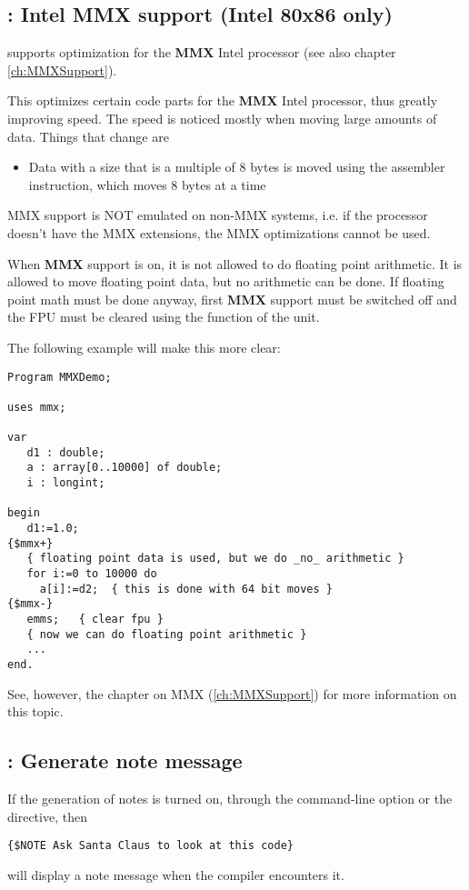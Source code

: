 \subsection{ : Intel MMX support (Intel 80x86 only)}

\fpc supports optimization for the \textbf{MMX} Intel
processor (see also chapter \ref{ch:MMXSupport}).

This optimizes certain code parts for the \textbf{MMX} Intel
processor, thus greatly improving speed. The speed is noticed mostly when
moving large amounts of data. Things that change are
\begin{itemize}
\item Data with a size that is a multiple of 8 bytes is moved using the
 assembler instruction, which moves 8 bytes at a time
\end{itemize}
\begin{remark}MMX support is NOT emulated on non-MMX systems, i.e. if
the processor doesn't have the MMX extensions, the MMX optimizations cannot
be used.
\end{remark}
When \textbf{MMX} support is on, it is not allowed to do floating point
arithmetic. It is allowed to move floating point data, but no arithmetic
can be done. If floating point math must be done anyway, first \textbf{MMX}
 support must be switched off and the FPU must be cleared using the 
function of the  unit.

The following example will make this more clear:
\begin{verbatim}
Program MMXDemo;

uses mmx;

var
   d1 : double;
   a : array[0..10000] of double;
   i : longint;

begin
   d1:=1.0;
{$mmx+}
   { floating point data is used, but we do _no_ arithmetic }
   for i:=0 to 10000 do
     a[i]:=d2;  { this is done with 64 bit moves }
{$mmx-}
   emms;   { clear fpu }
   { now we can do floating point arithmetic }
   ...
end.
\end{verbatim}
See, however, the chapter on MMX (\ref{ch:MMXSupport}) for more information
on this topic.

\subsection{ : Generate note message}

If the generation of notes is turned on, through the  command-line
option or the  directive, then
\begin{verbatim}
{$NOTE Ask Santa Claus to look at this code}
\end{verbatim}
will display a note message when the compiler encounters it.


